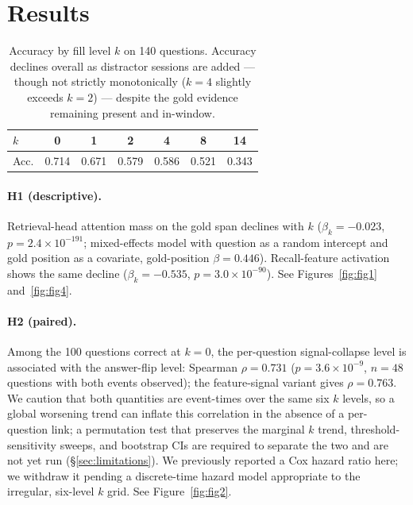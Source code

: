 \documentclass[10pt,twocolumn]{article}
\newcommand{\bk}{\beta_k}
\newcommand{\kof}[1]{k\!=\!#1}
\begin{document}
\section{Results}

\begin{table}[t]
\centering
\caption{Accuracy by fill level $k$ on 140 questions. Accuracy declines overall
as distractor sessions are added --- though not strictly monotonically
($k{=}4$ slightly exceeds $k{=}2$) --- despite the gold evidence remaining
present and in-window.}
\label{tab:acc}
\begin{tabular}{lcccccc}
\toprule
$k$ & 0 & 1 & 2 & 4 & 8 & 14 \\
\midrule
Acc. & 0.714 & 0.671 & 0.579 & 0.586 & 0.521 & 0.343 \\
\bottomrule
\end{tabular}
\end{table}

\paragraph{H1 (descriptive).}
Retrieval-head attention mass on the gold span declines with $k$
($\bk=-0.023$, $p=2.4\times10^{-191}$; mixed-effects model with question as a
random intercept and gold position as a covariate, gold-position
$\beta=0.446$). Recall-feature activation shows the same decline
($\bk=-0.535$, $p=3.0\times10^{-90}$). See Figures~\ref{fig:fig1}
and~\ref{fig:fig4}.

\paragraph{H2 (paired).}
Among the 100 questions correct at $\kof{0}$, the per-question
signal-collapse level is associated with the answer-flip level: Spearman
$\rho=0.731$ ($p=3.6\times10^{-9}$, $n=48$ questions with both events
observed); the feature-signal variant gives $\rho=0.763$. We caution that both
quantities are event-times over the same six $k$ levels, so a global worsening
trend can inflate this correlation in the absence of a per-question link; a
permutation test that preserves the marginal $k$ trend, threshold-sensitivity
sweeps, and bootstrap CIs are required to separate the two and are not yet run
(\S\ref{sec:limitations}). We previously reported a Cox hazard ratio here; we
withdraw it pending a discrete-time hazard model appropriate to the irregular,
six-level $k$ grid. See Figure~\ref{fig:fig2}.
\end{document}
